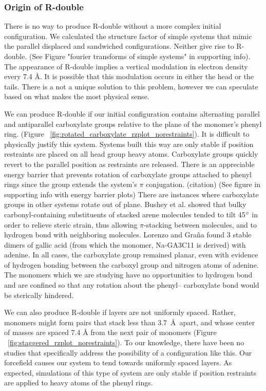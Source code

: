 \documentclass[journal=jpcbfk,manusciprt=article]{achemso}
\begin{document}
  \subsubsection{Origin of R-double}\label{section:rdouble}
  
  There is no way to produce R-double without a more complex initial configuration. We 
  calculated the structure factor of simple systems that mimic the parallel
  displaced and sandwiched configurations. Neither give rise to R-double. (See Figure "fourier
  transforms of simple systems" in supporting info). The appearance of R-double implies a
  vertical modulation in electron density every 7.4 \AA. It is possible that this modulation 
  occurs in either the head or the tails. There is a not a unique solution to this problem,
  however we can speculate based on what makes the most physical sense.
  
  We can produce R-double if our initial configuration contains alternating parallel and
  antiparallel carboxylate groups relative to the plane of the monomer's phenyl ring.
  (Figure ~\ref{fig:rotated_carboxylate_rzplot_norestraints}). It is difficult to physically
  justify this system. Systems built this way are only stable if position restraints are placed
  on all head group heavy atoms. Carboxylate groups quickly revert to the parallel position as 
  restraints are released. There is an appreciable energy barrier that prevents rotation
  of carboxylate groups attached to phenyl rings since the group extends the system's 
  $\pi$ conjugation. (citation) (See figure in supporting info with energy barrier plots)
  There are instances where carboxylate groups in other systems rotate out of plane. Bushey et
  al. showed that bulky carbonyl-containing substituents of stacked arene molecules tended to
  tilt 45$\degree$ in order to relieve steric strain, thus allowing $\pi$-stacking between 
  molecules, and to hydrogen bond with neighboring molecules. Lorenzo and Gra\~{n}a found 3
  stable dimers of gallic acid (from which the monomer, Na-GA3C11 is derived) with adenine. In
  all cases, the carboxylate group remained planar, even with evidence of hydrogen bonding
  between the carboxyl group and nitrogen atoms of adenine. The monomers which we are studying
  have no opportunities to hydrogen bond and are confined so that any rotation about the phenyl--
  carboxylate bond would be sterically hindered. 
  
  We can also produce R-double if layers are not uniformly spaced. Rather, monomers might form 
  pairs that stack less than 3.7~\AA~apart, and whose center of masses are spaced 7.4 \AA 
  from the next pair of monomers (Figure ~\ref{fig:staggered_rzplot_norestraints}). To our 
  knowledge, there have been no studies that specifically address the possibility of a
  configuration like this. Our forcefield causes our system to tend towards uniformly spaced
  layers. As expected, simulations of this type of system are only stable if position restraints
  are applied to heavy atoms of the phenyl rings.
  
\end{document}
